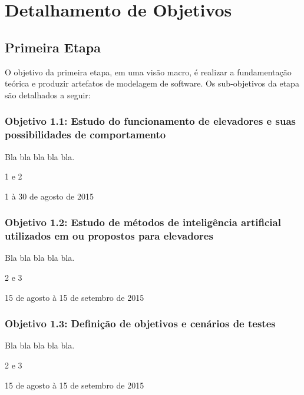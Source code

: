 \section{\label{section:objectives}Detalhamento de Objetivos}

\subsection{Primeira Etapa}

O objetivo da primeira etapa, em uma visão macro, é realizar a fundamentação
teórica e produzir artefatos de modelagem de software. Os sub-objetivos da etapa
são detalhados a seguir:

\subsubsection{\textbf{Objetivo 1.1}: Estudo do funcionamento de elevadores e suas possibilidades de comportamento}

\begin{description}[leftmargin=!,labelwidth=\widthof{\bfseries Descrição}]
  \item[Descrição] Bla bla bla bla bla.
  \item[Iterações] 1 e 2
  \item[Período]   1 à 30 de agosto de 2015
\end{description}

\subsubsection{\textbf{Objetivo 1.2}: Estudo de métodos de inteligência artificial utilizados em ou propostos para elevadores}

\begin{description}[leftmargin=!,labelwidth=\widthof{\bfseries Descrição}]
  \item[Descrição] Bla bla bla bla bla.
  \item[Iterações] 2 e 3
  \item[Período]   15 de agosto à 15 de setembro de 2015
\end{description}

\subsubsection{\textbf{Objetivo 1.3}: Definição de objetivos e cenários de testes}

\begin{description}[leftmargin=!,labelwidth=\widthof{\bfseries Descrição}]
  \item[Descrição] Bla bla bla bla bla.
  \item[Iterações] 2 e 3
  \item[Período]   15 de agosto à 15 de setembro de 2015
\end{description}

